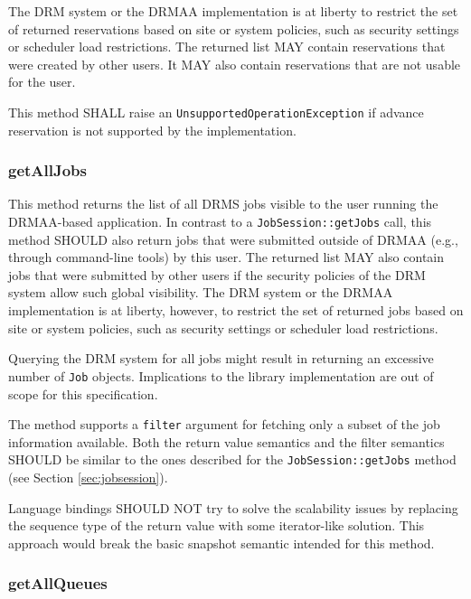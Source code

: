 \documentclass{article}
\newcommand{\h}[1]{\lstinline|#1|}
\newcommand{\langbind}[1]{\begin{shaded}#1\end{shaded}}
\newcommand{\rat}[1]{}
\begin{document}
 The DRM system or the DRMAA implementation is at liberty to restrict the set of returned reservations based on site or system policies, such as security settings or scheduler load restrictions. The returned list MAY contain reservations that were created by other users. It MAY also contain reservations that are not usable for the user.

This method SHALL raise an \h{UnsupportedOperationException} if advance reservation is not supported by the implementation.

\subsubsection{getAllJobs}

This method returns the list of all DRMS jobs visible to the user running the DRMAA-based application. In contrast to a \h{JobSession::getJobs} call, this method SHOULD also return jobs that were submitted outside of DRMAA (e.g., through command-line tools) by this user. The returned list MAY also contain jobs that were submitted by other users if the security policies of the DRM system allow such global visibility. The DRM system or the DRMAA implementation is at liberty, however, to restrict the set of returned jobs based on site or system policies, such as security settings or scheduler load restrictions.

Querying the DRM system for all jobs might result in returning an excessive number of \h{Job} objects. Implications to the library implementation are out of scope for this specification.

The method supports a \h{filter} argument for fetching only a subset of the job information available. Both the return value semantics and the filter semantics SHOULD be similar to the ones described for the \h{JobSession::getJobs} method (see Section \ref{sec:jobsession}).

\langbind{
Language bindings SHOULD NOT try to solve the scalability issues by replacing the sequence type of the return value with some iterator-like solution. This approach would break the basic snapshot semantic intended for this method.
}

\rat{
The non-argumentation about the scalability problem was the final result of a clarification attempt. We hand this one over to the implementors. (conf call Jul 14th 2010)
}

\subsubsection{getAllQueues}
\end{document}
